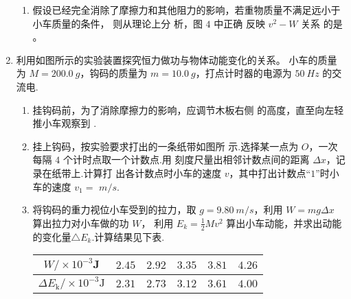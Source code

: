 \begin{enumerate}
\begin{enumerate}
\item 
假设已经完全消除了摩擦力和其他阻力的影响，若重物质量不满足远小于小车质量的条件，
则从理论上分
析，图 $ 4 $ 中正确
反映 $ v^{2} - W $ 关系
的是  。
\begin{figure}[h!]
\centering

\end{figure}


\end{enumerate}



\newpage
\item 
{}
利用如图所示的实验装置探究恒力做功与物体动能变化的关系。
小车的质量为 $ M=200.0 \ g $，钩码的质量为 $ m=10.0 \ g $，打点计时器的电源为 $ 50 \ Hz $ 的交流电.
\begin{figure}[h!]
\centering

\end{figure}


\begin{enumerate}
\renewcommand{\labelenumi}{\arabic{enumi}.}
\item
挂钩码前，为了消除摩擦力的影响，应调节木板右侧
的高度，直至向左轻推小车观察到  .

\item 
挂上钩码，按实验要求打出的一条纸带如图所
示.选择某一点为 $ O $，一次每隔 $ 4 $ 个计时点取一个计数点.用
刻度尺量出相邻计数点间的距离 $ \Delta x $，记录在纸带上.计算打
出各计数点时小车的速度 $ v $，其中打出计数点“$ 1 $”时小车的速度 $ v_{1}= $  $ m/s $.
\begin{figure}[h!]
\centering

\end{figure}


\item 
将钩码的重力视位小车受到的拉力，取 $ g=9.80 \ m/s $，利用 $ W=mg\Delta x $ 算出拉力对小车做的功 $ W $，
利用 $ E_{k} = \frac{ 1 }{ 2 } M v^{2} $ 算出小车动能，并求出动能的变化量$ \triangle E_{k} $.计算结果见下表.
\begin{table}[h!]
\centering 
\begin{tabular}{|c|c|c|c|c|c|}
\hline 
$W / \times 10^{-3} \mathbf{J}$ & $ 2.45 $ & $ 2.92 $ & $ 3.35 $ & $ 3.81 $ & $ 4.26 $
 \\
\hline
$\Delta E_{\mathrm{k}} / \times 10^{-3} \mathrm{J}$ & $ 2.31 $ & $ 2.73 $ & $ 3.12 $ & $ 3.61 $ & $ 4.00 $\\ 
\hline 
\end{tabular}
\end{table} 





\end{enumerate}
\end{enumerate}
